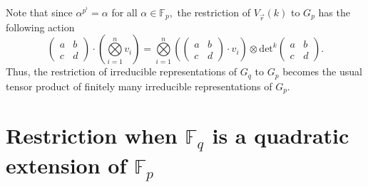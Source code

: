 \documentclass[10pt, reqno]{amsart}
\def\F{{\mathbb F}}
\def\Gq{{G_q}}
\def\Gp{{G_p}}
\numberwithin{equation}{section}
\theoremstyle{remark}
\begin{document}
Note that since $\alpha^{p^i}=\alpha$ for all $\alpha\in\F_p,$ the restriction of $V_{\vec{r}}(k)$ to $\Gp$ has the following action
$$\left(
		\begin{matrix}
			a & b\\
			c & d
		\end{matrix}
		\right)\cdot \left(\bigotimes\limits_{i=1}^n v_i\right)=\bigotimes\limits_{i=1}^n\left(\left(
		\begin{matrix}
			a & b\\
			c & d
		\end{matrix}
		\right)\cdot v_i\right)\otimes \mathrm{det}^{k}\left(
		\begin{matrix}
			a & b\\
			c & d
		\end{matrix}
		\right).$$
Thus, the restriction of irreducible representations of $\Gq$ to $\Gp$ becomes the usual tensor product of finitely many irreducible representations of $\Gp.$
	
	
	\section{Restriction when $\F_q$ is a quadratic extension of $\F_p$}\label{S3}
\end{document}
